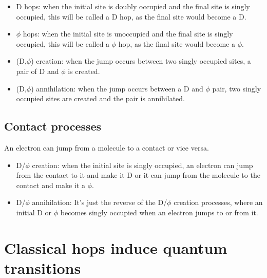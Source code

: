 \documentclass[a4paper,twocolumn]{revtex4-1} %
\begin{document}
\begin{itemize}
\item{D hops:}
when the initial site is doubly occupied and the final site is singly occupied,
this will be called a D hop, as the final site would become a D.
\item{$\phi$ hops:}
when the initial site is unoccupied and the final site is singly occupied,
this will be called a $\phi$ hop, as the final site would become a $\phi$.

\item{(D,$\phi$) creation:}
when the jump occurs between two singly occupied sites,
a pair of  D and $\phi$ is created.

\item{(D,$\phi$) annihilation:}
when the jump occurs between a D and $\phi$ pair, 
two singly occupied sites are created and the pair is annihilated.

\end{itemize}


\subsection{Contact processes}

An electron can jump from a molecule to a contact or vice versa.

\begin{itemize}
\item{D/$\phi$ creation:}
when the initial site is singly occupied, an electron can jump from the contact to it and make it D or it can jump from the molecule to the contact and make it a $\phi$.

\item{D/$\phi$ annihilation:}
It's just the reverse of the D/$\phi$ creation processes, where an initial D or $\phi$ becomes singly occupied when an electron jumps to or from it. 
\end{itemize}



\section{Classical hops induce quantum transitions}
\end{document}
